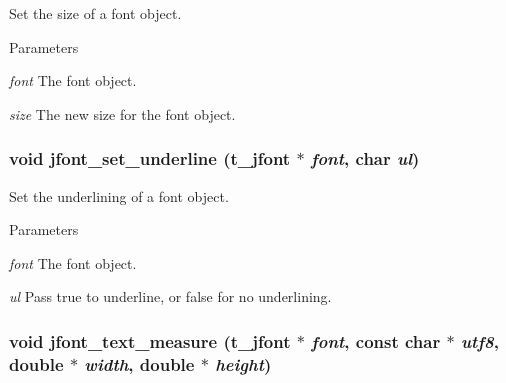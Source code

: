 Set the size of a font object. 
\begin{DoxyParams}{Parameters}
\item[{\em font}]The font object. \item[{\em size}]The new size for the font object. \end{DoxyParams}
\hypertarget{group__jfont_ga40e5705b583cf366c6b7a23a88df9050}{
\subsubsection[{jfont\_\-set\_\-underline}]{\setlength{\rightskip}{0pt plus 5cm}void jfont\_\-set\_\-underline ({\bf t\_\-jfont} $\ast$ {\em font}, \/  char {\em ul})}}
\label{group__jfont_ga40e5705b583cf366c6b7a23a88df9050}


Set the underlining of a font object. 
\begin{DoxyParams}{Parameters}
\item[{\em font}]The font object. \item[{\em ul}]Pass true to underline, or false for no underlining. \end{DoxyParams}
\hypertarget{group__jfont_gad587e956e70581198b075cb336b4ccce}{
\subsubsection[{jfont\_\-text\_\-measure}]{\setlength{\rightskip}{0pt plus 5cm}void jfont\_\-text\_\-measure ({\bf t\_\-jfont} $\ast$ {\em font}, \/  const char $\ast$ {\em utf8}, \/  double $\ast$ {\em width}, \/  double $\ast$ {\em height})}}
\label{group__jfont_gad587e956e70581198b075cb336b4ccce}


